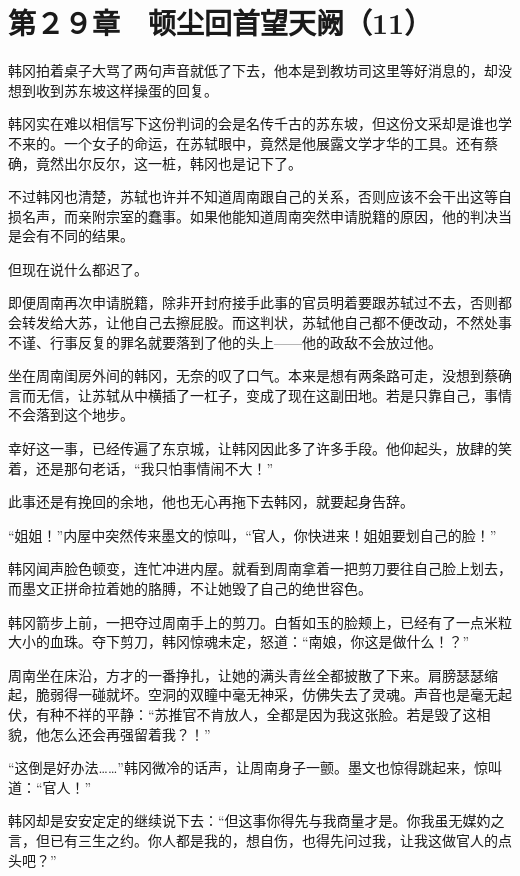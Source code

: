 \section{第２９章　顿尘回首望天阙（11）}

韩冈拍着桌子大骂了两句声音就低了下去，他本是到教坊司这里等好消息的，却没想到收到苏东坡这样操蛋的回复。

韩冈实在难以相信写下这份判词的会是名传千古的苏东坡，但这份文采却是谁也学不来的。一个女子的命运，在苏轼眼中，竟然是他展露文学才华的工具。还有蔡确，竟然出尔反尔，这一桩，韩冈也是记下了。

不过韩冈也清楚，苏轼也许并不知道周南跟自己的关系，否则应该不会干出这等自损名声，而亲附宗室的蠢事。如果他能知道周南突然申请脱籍的原因，他的判决当是会有不同的结果。

但现在说什么都迟了。

即便周南再次申请脱籍，除非开封府接手此事的官员明着要跟苏轼过不去，否则都会转发给大苏，让他自己去擦屁股。而这判状，苏轼他自己都不便改动，不然处事不谨、行事反复的罪名就要落到了他的头上——他的政敌不会放过他。

坐在周南闺房外间的韩冈，无奈的叹了口气。本来是想有两条路可走，没想到蔡确言而无信，让苏轼从中横插了一杠子，变成了现在这副田地。若是只靠自己，事情不会落到这个地步。

幸好这一事，已经传遍了东京城，让韩冈因此多了许多手段。他仰起头，放肆的笑着，还是那句老话，“我只怕事情闹不大！”

此事还是有挽回的余地，他也无心再拖下去韩冈，就要起身告辞。

“姐姐！”内屋中突然传来墨文的惊叫，“官人，你快进来！姐姐要划自己的脸！”

韩冈闻声脸色顿变，连忙冲进内屋。就看到周南拿着一把剪刀要往自己脸上划去，而墨文正拼命拉着她的胳膊，不让她毁了自己的绝世容色。

韩冈箭步上前，一把夺过周南手上的剪刀。白皙如玉的脸颊上，已经有了一点米粒大小的血珠。夺下剪刀，韩冈惊魂未定，怒道：“南娘，你这是做什么！？”

周南坐在床沿，方才的一番挣扎，让她的满头青丝全都披散了下来。肩膀瑟瑟缩起，脆弱得一碰就坏。空洞的双瞳中毫无神采，仿佛失去了灵魂。声音也是毫无起伏，有种不祥的平静：“苏推官不肯放人，全都是因为我这张脸。若是毁了这相貌，他怎么还会再强留着我？！”

“这倒是好办法……”韩冈微冷的话声，让周南身子一颤。墨文也惊得跳起来，惊叫道：“官人！”

韩冈却是安安定定的继续说下去：“但这事你得先与我商量才是。你我虽无媒妁之言，但已有三生之约。你人都是我的，想自伤，也得先问过我，让我这做官人的点头吧？”

